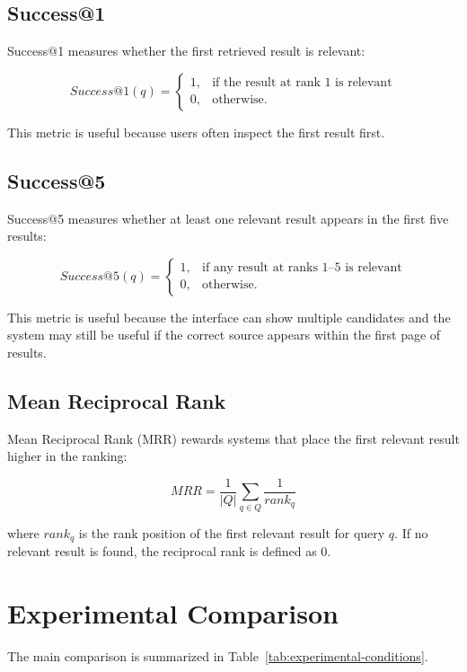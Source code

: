 \subsection{Success@1}
Success@1 measures whether the first retrieved result is relevant:

\begin{equation}
Success@1(q) =
\begin{cases}
1, & \text{if the result at rank 1 is relevant} \\
0, & \text{otherwise.}
\end{cases}
\end{equation}

This metric is useful because users often inspect the first result first.

\subsection{Success@5}
Success@5 measures whether at least one relevant result appears in the first five results:

\begin{equation}
Success@5(q) =
\begin{cases}
1, & \text{if any result at ranks 1--5 is relevant} \\
0, & \text{otherwise.}
\end{cases}
\end{equation}

This metric is useful because the interface can show multiple candidates and the system may still be useful if the correct source appears within the first page of results.

\subsection{Mean Reciprocal Rank}
Mean Reciprocal Rank (MRR) rewards systems that place the first relevant result higher in the ranking:

\begin{equation}
MRR = \frac{1}{|Q|} \sum_{q \in Q} \frac{1}{rank_q}
\end{equation}

where $rank_q$ is the rank position of the first relevant result for query $q$. If no relevant result is found, the reciprocal rank is defined as 0.

\section{Experimental Comparison}
The main comparison is summarized in Table~\ref{tab:experimental-conditions}.

